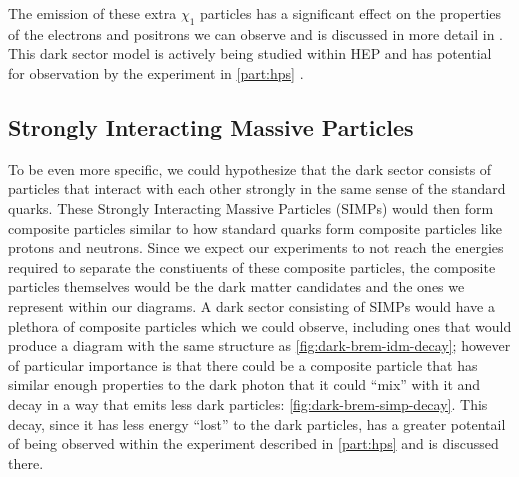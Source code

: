 The emission of these extra $\chi_1$ particles has a significant effect on the properties of the electrons
and positrons we can observe and is discussed in more detail in .
This dark sector model
is actively being studied within HEP and has potential for observation by the experiment in \cref{part:hps}
\cite{darkseaquest-2018}.

\subsection{Strongly Interacting Massive Particles}
\label{sec:theory-simps}

To be even more specific, we could hypothesize that the dark sector consists of particles that
interact with each other strongly in the same sense of the standard quarks. These Strongly
Interacting Massive Particles (SIMPs) \cite{simp-mechanism-2014,simp-pheno-2018} would then form composite particles similar to how standard
quarks form composite particles like protons and neutrons. Since we expect our experiments to
not reach the energies required to separate the constiuents of these composite particles,
the composite particles themselves would be the dark matter candidates and the ones we represent
within our diagrams. A dark sector consisting of SIMPs would have a plethora of composite particles
which we could observe, including ones that would produce a diagram with the same structure as
\cref{fig:dark-brem-idm-decay}; however of particular importance is that there could be a composite
particle that has similar enough properties to the dark photon that it could ``mix'' with it and 
decay in a way that emits less dark particles: \cref{fig:dark-brem-simp-decay}. This decay, since
it has less energy ``lost'' to the dark particles, has a greater potentail of being observed within
the experiment described in \cref{part:hps} and is discussed there.

